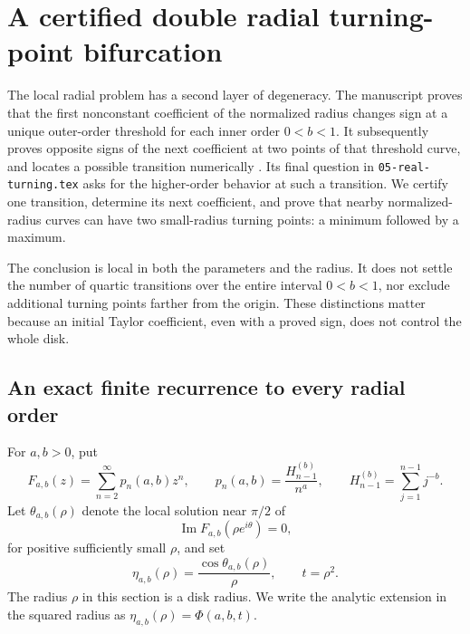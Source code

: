 \section{A certified double radial turning-point bifurcation}
\label{turn:sec:main}

The local radial problem has a second layer of degeneracy.  The
manuscript proves that the first nonconstant coefficient of the
normalized radius changes sign at a unique outer-order threshold for
each inner order $0<b<1$.  It subsequently proves opposite signs of the
next coefficient at two points of that threshold curve, and locates a
possible transition numerically \cite{Repo}.  Its final question in
\texttt{05-real-turning.tex} asks for the higher-order behavior at such a
transition.  We certify one transition, determine its next coefficient,
and prove that nearby normalized-radius curves can have two small-radius
turning points: a minimum followed by a maximum.

The conclusion is local in both the parameters and the radius.  It
does not settle the number of quartic transitions over the entire
interval $0<b<1$, nor exclude additional turning points farther from
the origin.  These distinctions matter because an initial Taylor
coefficient, even with a proved sign, does not control the whole disk.

\subsection{An exact finite recurrence to every radial order}
\label{turn:sec:recurrence}

For $a,b>0$, put
\begin{equation}
 F_{a,b}(z)=\sum_{n=2}^{\infty}p_n(a,b)z^n,
 \qquad
 p_n(a,b)=\frac{H_{n-1}^{(b)}}{n^a},
 \qquad
 H_{n-1}^{(b)}=\sum_{j=1}^{n-1}j^{-b}.
 \label{turn:eq:def}
\end{equation}
Let $\theta_{a,b}(\rho)$ denote the local solution near $\pi/2$ of
\[
 \operatorname{Im}F_{a,b}(\rho e^{i\theta})=0,
\]
for positive sufficiently small $\rho$, and set
\begin{equation}
 \eta_{a,b}(\rho)=\frac{\cos\theta_{a,b}(\rho)}{\rho},
 \qquad t=\rho^2.
 \label{turn:eq:eta}
\end{equation}
The radius $\rho$ in this section is a disk radius.  We write the
analytic extension in the squared radius as
$\eta_{a,b}(\rho)=\Phi(a,b,t)$.

